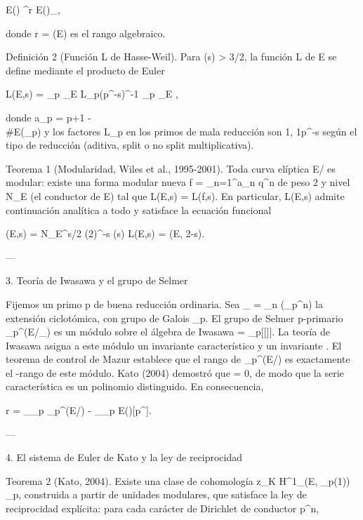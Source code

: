 \documentclass[12pt,twoside]{book}
\begin{document}
E() \cong {}^r \times E()_{},

donde r = (E) es el rango algebraico.

Definición 2 (Función L de Hasse-Weil). Para \Re(s) > 3/2, la función L de E se define mediante el producto de Euler

L(E,s) = \prod_{p \mid \Delta_E} L_p(p^{-s})^{-1} \prod_{p \nmid \Delta_E} ,

donde a_p = p+1 - \\#E(_p) y los factores L_p en los primos de mala reducción son 1, 1\pm p^{-s} según el tipo de reducción (aditiva, split o no split multiplicativa).

Teorema 1 (Modularidad, Wiles et al., 1995-2001). Toda curva elíptica E/ es modular: existe una forma modular nueva f = \sum_{n=1}^\infty a_n q^n de peso 2 y nivel N_E (el conductor de E) tal que L(E,s) = L(f,s). En particular, L(E,s) admite continuación analítica a todo  y satisface la ecuación funcional

\Lambda(E,s) = N_E^{s/2} (2\pi)^{-s} \Gamma(s) L(E,s) = \pm \Lambda(E, 2-s).

---

3. Teoría de Iwasawa y el grupo de Selmer

Fijemos un primo p de buena reducción ordinaria. Sea _{\infty} = \bigcup_{n} (\mu_{p^n}) la extensión ciclotómica, con grupo de Galois \Gamma \cong {}_p. El grupo de Selmer p-primario _{p^\infty}(E/_{\infty}) es un módulo sobre el álgebra de Iwasawa \Lambda = _p[[\Gamma]]. La teoría de Iwasawa asigna a este módulo un invariante característico \lambda y un invariante \mu. El teorema de control de Mazur establece que el rango de _{p^\infty}(E/) es exactamente el \Lambda-rango de este módulo. Kato (2004) demostró que \mu = 0, de modo que la serie característica es un polinomio distinguido. En consecuencia,

r = _{_p} _{p^\infty}(E/) - \dim_{_p} E()[p^\infty].

---

4. El sistema de Euler de Kato y la ley de reciprocidad

Teorema 2 (Kato, 2004). Existe una clase de cohomología z_K \in H^1_{}(E, _p(1)) \otimes {}_p, construida a partir de unidades modulares, que satisface la ley de reciprocidad explícita: para cada carácter de Dirichlet \chi de conductor p^n,
\end{document}
